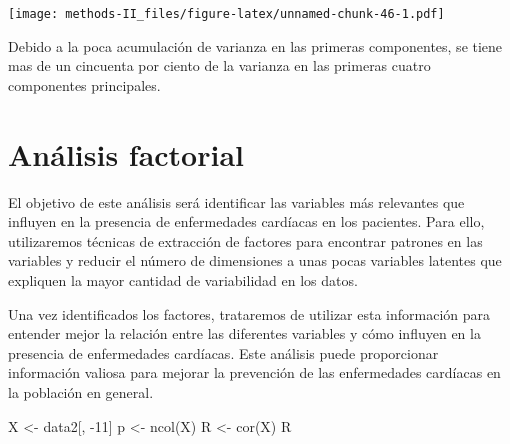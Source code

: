 \documentclass[
]{article}
\newenvironment{Shaded}{\begin{snugshade}}{\end{snugshade}}
\newcommand{\DecValTok}[1]{\textcolor[rgb]{0.00,0.00,0.81}{#1}}
\newcommand{\FunctionTok}[1]{\textcolor[rgb]{0.00,0.00,0.00}{#1}}
\newcommand{\NormalTok}[1]{#1}
\newcommand{\OtherTok}[1]{\textcolor[rgb]{0.56,0.35,0.01}{#1}}
\newcommand{\SpecialCharTok}[1]{\textcolor[rgb]{0.00,0.00,0.00}{#1}}
\begin{document}
\texttt{[image: methods-II\_files/figure-latex/unnamed-chunk-46-1.pdf]}

Debido a la poca acumulación de varianza en las primeras componentes, se
tiene mas de un cincuenta por ciento de la varianza en las primeras
cuatro componentes principales.

\hypertarget{anuxe1lisis-factorial}{%
\section{Análisis factorial}\label{anuxe1lisis-factorial}}

El objetivo de este análisis será identificar las variables más
relevantes que influyen en la presencia de enfermedades cardíacas en los
pacientes. Para ello, utilizaremos técnicas de extracción de factores
para encontrar patrones en las variables y reducir el número de
dimensiones a unas pocas variables latentes que expliquen la mayor
cantidad de variabilidad en los datos.

Una vez identificados los factores, trataremos de utilizar esta
información para entender mejor la relación entre las diferentes
variables y cómo influyen en la presencia de enfermedades cardíacas.
Este análisis puede proporcionar información valiosa para mejorar la
prevención de las enfermedades cardíacas en la población en general.

\begin{Shaded}
\begin{Highlighting}[]
\NormalTok{X }\OtherTok{\textless{}{-}}\NormalTok{ data2[, }\SpecialCharTok{{-}}\DecValTok{11}\NormalTok{]}
\NormalTok{p }\OtherTok{\textless{}{-}} \FunctionTok{ncol}\NormalTok{(X)}
\NormalTok{R }\OtherTok{\textless{}{-}} \FunctionTok{cor}\NormalTok{(X)}
\NormalTok{R}
\end{Highlighting}
\end{Shaded}
\end{document}
